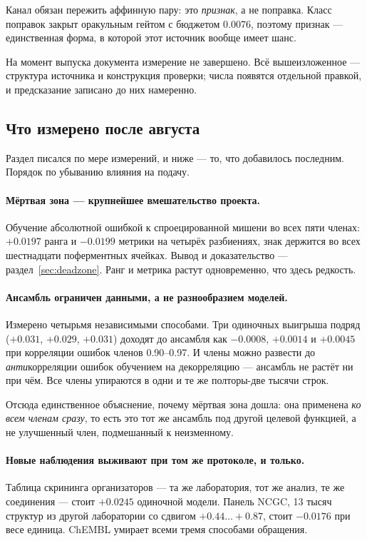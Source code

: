 Канал обязан пережить аффинную пару: это \emph{признак}, а не поправка. Класс поправок закрыт
оракульным гейтом с бюджетом 0.0076, поэтому признак --- единственная форма, в которой этот
источник вообще имеет шанс.

На момент выпуска документа измерение не завершено. Всё вышеизложенное --- структура источника
и конструкция проверки; числа появятся отдельной правкой, и предсказание записано до них
намеренно.

\subsection{Что измерено после августа}

Раздел писался по мере измерений, и ниже --- то, что добавилось последним. Порядок по убыванию
влияния на подачу.

\paragraph{Мёртвая зона --- крупнейшее вмешательство проекта.} Обучение абсолютной ошибкой к
спроецированной мишени во всех пяти членах: $+0.0197$ ранга и $-0.0199$ метрики на четырёх
разбиениях, знак держится во всех шестнадцати поферментных ячейках. Вывод и доказательство ---
раздел~\ref{sec:deadzone}. Ранг и метрика растут одновременно, что здесь редкость.

\paragraph{Ансамбль ограничен данными, а не разнообразием моделей.} Измерено четырьмя независимыми
способами. Три одиночных выигрыша подряд ($+0.031$, $+0.029$, $+0.031$) доходят до ансамбля как
$-0.0008$, $+0.0014$ и $+0.0045$ при корреляции ошибок членов 0.90--0.97. И члены можно развести
до \emph{анти}корреляции ошибок обучением на декорреляцию --- ансамбль не растёт ни при чём. Все
члены упираются в одни и те же полторы-две тысячи строк.

Отсюда единственное объяснение, почему мёртвая зона дошла: она применена \emph{ко всем членам сразу},
то есть это тот же ансамбль под другой целевой функцией, а не улучшенный член, подмешанный к
неизменному.

\paragraph{Новые наблюдения выживают при том же протоколе, и только.} Таблица скрининга организаторов
--- та же лаборатория, тот же анализ, те же соединения --- стоит $+0.0245$ одиночной модели. Панель
NCGC, 13 тысяч структур из другой лаборатории со сдвигом $+0.44\ldots+0.87$, стоит $-0.0176$ при весе
единица. ChEMBL умирает всеми тремя способами обращения.

